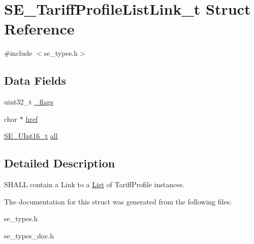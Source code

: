 \hypertarget{structSE__TariffProfileListLink__t}{}\section{S\+E\+\_\+\+Tariff\+Profile\+List\+Link\+\_\+t Struct Reference}
\label{structSE__TariffProfileListLink__t}


{\ttfamily \#include $<$se\+\_\+types.\+h$>$}

\subsection*{Data Fields}
\begin{DoxyCompactItemize}
\item 
uint32\+\_\+t \hyperlink{group__TariffProfileListLink_ga0dc6e32b1d1482a70c30f1f8d19952a0}{\+\_\+flags}
\item 
char $\ast$ \hyperlink{group__TariffProfileListLink_gaf7827e008cf5e071627cedf3e60ac752}{href}
\item 
\hyperlink{group__UInt16_gac68d541f189538bfd30cfaa712d20d29}{S\+E\+\_\+\+U\+Int16\+\_\+t} \hyperlink{group__TariffProfileListLink_ga7a7b6ee13dc95e02bb1511987c9bcbc6}{all}
\end{DoxyCompactItemize}


\subsection{Detailed Description}
S\+H\+A\+LL contain a Link to a \hyperlink{structList}{List} of Tariff\+Profile instances. 

The documentation for this struct was generated from the following files\+:\begin{DoxyCompactItemize}
\item 
se\+\_\+types.\+h\item 
se\+\_\+types\+\_\+doc.\+h\end{DoxyCompactItemize}
